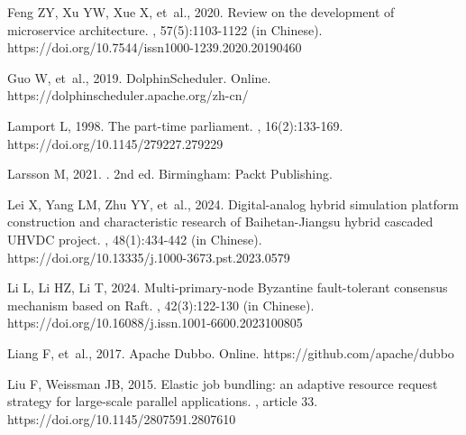 \begin{thebibliography}{}
Feng ZY, Xu YW, Xue X, {et~al.}, 2020.
\newblock Review on the development of microservice architecture.
, 57(5):1103-1122 (in Chinese). \\
https://doi.org/10.7544/issn1000-1239.2020.20190460

Guo W, {et~al.}, 2019.
\newblock DolphinScheduler.
\newblock Online. https://dolphinscheduler.apache.org/zh-cn/

Lamport L, 1998.
\newblock The part-time parliament.
, 16(2):133-169. \\
https://doi.org/10.1145/279227.279229

Larsson M, 2021.
.
\newblock 2nd ed. Birmingham: Packt Publishing.

Lei X, Yang LM, Zhu YY, {et~al.}, 2024.
\newblock Digital-analog hybrid simulation platform construction and characteristic research of Baihetan-Jiangsu hybrid cascaded UHVDC project.
, 48(1):434-442 (in Chinese). \\
https://doi.org/10.13335/j.1000-3673.pst.2023.0579

Li L, Li HZ, Li T, 2024.
\newblock Multi-primary-node Byzantine fault-tolerant consensus mechanism based on Raft.
, 42(3):122-130 (in Chinese). \\
https://doi.org/10.16088/j.issn.1001-6600.2023100805

Liang F, {et~al.}, 2017.
\newblock Apache Dubbo.
\newblock Online. https://github.com/apache/dubbo

Liu F, Weissman JB, 2015.
\newblock Elastic job bundling: an adaptive resource request strategy for large-scale parallel applications.
, article 33. \\
https://doi.org/10.1145/2807591.2807610


\end{thebibliography}
